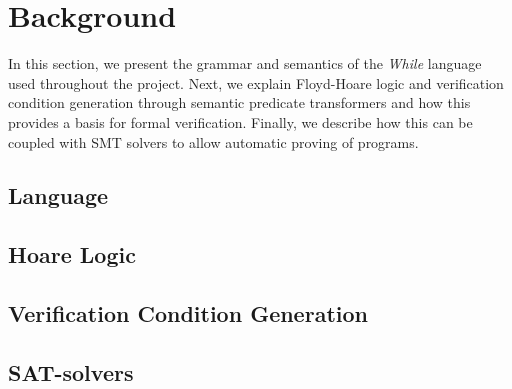 \section{Background}\label{sec:Background}
In this section, we present the grammar and semantics of the \textit{While} language used throughout the project.
Next, we explain Floyd-Hoare logic and verification condition generation through semantic predicate transformers and how this provides a basis for formal verification.
Finally, we describe how this can be coupled with SMT solvers to allow automatic proving of programs.

\subsection{Language}\label{sec:Language}


\subsection{Hoare Logic}\label{sec:hoare}


\subsection{Verification Condition Generation}\label{sec:vcg}


\subsection{SAT-solvers}

